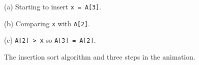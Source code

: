 \begin{figure}
\begin{center}
\bigskip


\smallskip
(a) Starting to insert \verb$x = A[3]$.

\bigskip
{}

\smallskip
(b) Comparing \verb$x$ with \verb$A[2]$.

\bigskip
{}

\smallskip
(c) \verb$A[2] > x$ so \verb$A[3] = A[2]$.

\end{center}

\caption{The insertion sort algorithm
and three steps in the animation.}
\label{fig:insertion_sort_animation}
\end{figure}
